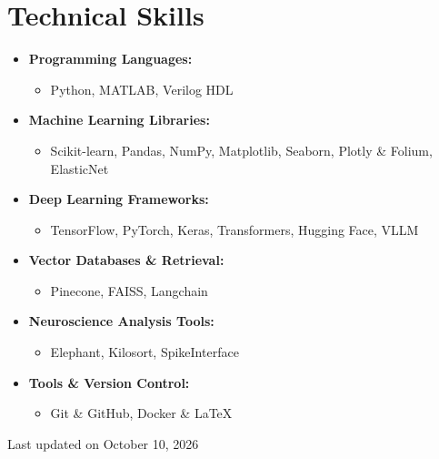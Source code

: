 \documentclass[letterpaper,11pt]{article}
\newcommand{\updateinfo}[1][\today]{\par\vfill\hfill{\scriptsize Last updated on #1}}
\begin{document}
\section{Technical Skills}
    \begin{itemize}
    \item \textbf{Programming Languages:} \\
     \begin{itemize}
        \item Python, MATLAB, Verilog HDL
    \end{itemize}
    
    \item \textbf{Machine Learning Libraries:} \\
    \begin{itemize}
        \item Scikit-learn, Pandas, NumPy, Matplotlib, Seaborn, Plotly \& Folium, ElasticNet
    \end{itemize}
     \item \textbf{Deep Learning Frameworks:} \\
    \begin{itemize}
        \item TensorFlow, PyTorch, Keras, Transformers, Hugging Face, VLLM
    \end{itemize}
    \item \textbf{Vector Databases \& Retrieval:} \\
    \begin{itemize}
        \item Pinecone, FAISS, Langchain
    \end{itemize}
    \item \textbf{Neuroscience Analysis Tools:} \\
    \begin{itemize}
        \item Elephant, Kilosort, SpikeInterface
    \end{itemize}
    \item \textbf{Tools \& Version Control:} \\
    \begin{itemize}
        \item Git \& GitHub, Docker \& \LaTeX
    \end{itemize}
    \end{itemize}
    




%


\updateinfo[October 10, 2026]
\end{document}
